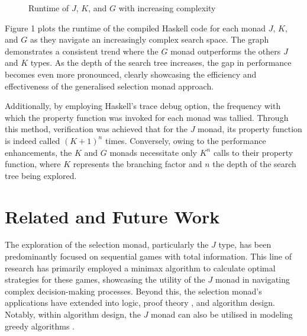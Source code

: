 \documentclass[runningheads]{llncs}
\begin{document}
\begin{figure}[H]
\begin{center}
\end{center}
\caption{Runtime of $J$, $K$, and $G$ with increasing complexity}
\end{figure}

Figure 1 plots the runtime of the compiled Haskell code for each monad
\(J\), \(K\), and \(G\) as they navigate an increasingly complex search
space. The graph demonstrates a consistent trend where the \(G\) monad
outperforms the others \(J\) and \(K\) types. As the depth of the search
tree increases, the gap in performance becomes even more pronounced,
clearly showcasing the efficiency and effectiveness of the generalised
selection monad approach.

\qquad Additionally, by employing Haskell's trace debug option, the
frequency with which the property function was invoked for each monad
was tallied. Through this method, verification was achieved that for the
\(J\) monad, its property function is indeed called \((K + 1)^n\) times.
Conversely, owing to the performance enhancements, the \(K\) and \(G\)
monads necessitate only \(K^n\) calls to their property function, where
\(K\) represents the branching factor and \(n\) the depth of the search
tree being explored.

\section{Related and Future Work}\label{related-and-future-work}

The exploration of the selection monad, particularly the \(J\) type, has
been predominantly focused on sequential games with total
information\cite{escardo2010sequential}. This line of research has
primarily employed a minimax algorithm to calculate optimal strategies
for these games, showcasing the utility of the \(J\) monad in navigating
complex decision-making processes. Beyond this, the selection monad's
applications have extended into logic, proof theory
\cite{escardo2010sequential}, and algorithm design. Notably, within
algorithm design, the \(J\) monad can also be utilised in modeling
greedy algorithms \cite{hartmann2022algorithm}.
\end{document}
